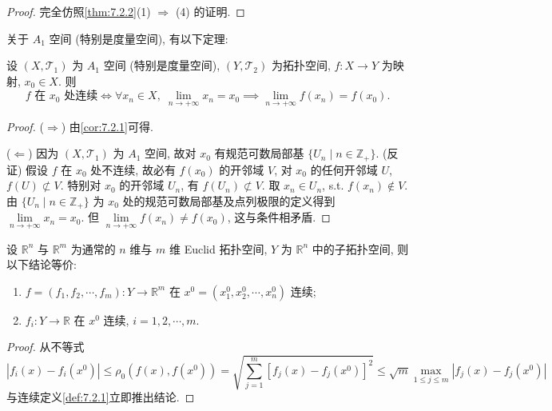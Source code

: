 \begin{proof}
完全仿照\cref{thm:7.2.2}(1) $\Rightarrow$ (4) 的证明.
\end{proof}

关于 $A_{1}$ 空间 (特别是度量空间), 有以下定理:

\begin{theorem}\label{thm:7.2.3}
设 $(X, \mathcal{T}_{1})$ 为 $A_{1}$ 空间 (特别是度量空间), $(Y, \mathcal{T}_{2})$ 为拓扑空间, $f\colon X \to Y$ 为映射, $x_{0} \in X$. 则
\[
  f \text{ 在 } x_{0} \text{ 处连续} \iff \forall x_{n} \in X, \; \lim_{n \to +\infty} x_{n} = x_{0} \implies \lim_{n \to +\infty} f(x_{n}) = f(x_{0}).
\]
\end{theorem}

\begin{proof}
($\Rightarrow$) 由\cref{cor:7.2.1}可得.

($\Leftarrow$) 因为 $(X, \mathcal{T}_{1})$ 为 $A_{1}$ 空间, 故对 $x_{0}$ 有规范可数局部基 $\{U_{n} \mid n \in \mathbb{Z}_{+}\}$. (反证) 假设 $f$ 在 $x_{0}$ 处不连续, 故必有 $f(x_{0})$ 的开邻域 $V$, 对 $x_{0}$ 的任何开邻域 $U$, $f(U) \not\subset V$. 特别对 $x_{0}$ 的开邻域 $U_{n}$, 有 $f(U_{n}) \not\subset V$. 取 $x_{n} \in U_{n}$, s.t. $f(x_{n}) \notin V$. 由 $\{U_{n} \mid n \in \mathbb{Z}_{+}\}$ 为 $x_{0}$ 处的规范可数局部基及点列极限的定义得到 $\lim\limits_{n \to +\infty} x_{n} = x_{0}$. 但 $\lim\limits_{n \to +\infty} f(x_{n}) \neq f(x_{0})$, 这与条件相矛盾.
\end{proof}

\begin{theorem}\label{thm:7.2.4}
设 $\mathbb{R}^n$ 与 $\mathbb{R}^m$ 为通常的 $n$ 维与 $m$ 维 Euclid 拓扑空间, $Y$ 为 $\mathbb{R}^n$ 中的子拓扑空间, 则以下结论等价:
\begin{enumerate}
  \item $f = (f_1, f_2, \cdots, f_m)\colon Y \to \mathbb{R}^m$ 在 $x^0 = (x_1^0, x_2^0, \cdots, x_n^0)$ 连续;
  \item $f_i\colon Y \to \mathbb{R}$ 在 $x^0$ 连续, $i = 1, 2, \cdots, m$.
\end{enumerate}
\end{theorem}

\begin{proof}
从不等式
\[
  |f_{i}(x) - f_{i}(x^{0})| \leqslant \rho_{0}(f(x), f(x^{0})) = \sqrt{\sum_{j=1}^{m} [f_{j}(x) - f_{j}(x^{0})]^{2}} \leqslant \sqrt{m} \max_{1 \leqslant j \leqslant m} |f_{j}(x) - f_{j}(x^{0})|
\]
与连续定义\cref{def:7.2.1}立即推出结论.
\end{proof}

